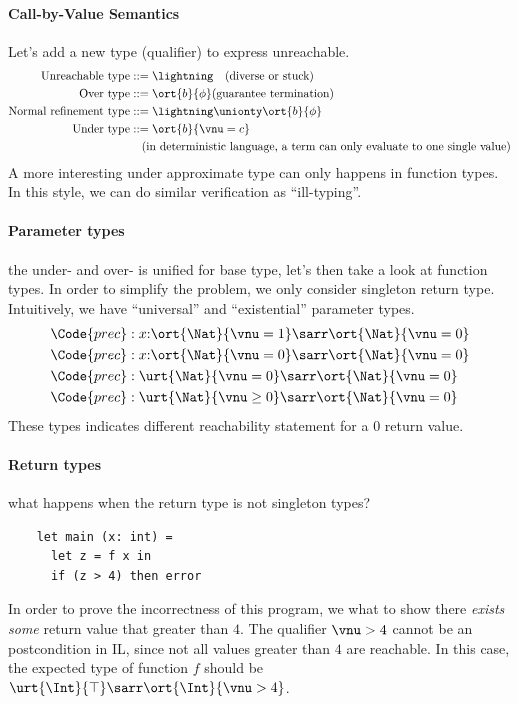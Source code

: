 \paragraph{Call-by-Value Semantics} Let's add a new type (qualifier) to express unreachable.
\begin{align*}
    \text{Unreachable type} & ::= \lightning \quad (\text{diverse or stuck})
    \\ \text{Over type} & ::= \ort{b}{\phi}  (\text{guarantee termination})
    \\ \text{Normal refinement type} & ::= \lightning \unionty \ort{b}{\phi}
    \\ \text{Under type} & ::= \ort{b}{\vnu = c} 
    \\ & \quad (\text{in deterministic language, a term can only evaluate to one single value})
\end{align*}\noindent
A more interesting under approximate type can only happens in function types. In this style, we can do similar verification as ``ill-typing''.

\paragraph{Parameter types} the under- and over- is unified for base type, let's then take a look at function types. In order to simplify the problem, we only consider singleton return type. Intuitively, we have ``universal'' and ``existential'' parameter types.
\begin{align*}
    \Code{prec} :\;& x{:}\ort{\Nat}{\vnu = 1} \sarr \ort{\Nat}{\vnu = 0} \\
    \Code{prec} :\;& x{:}\ort{\Nat}{\vnu = 0} \sarr \ort{\Nat}{\vnu = 0} \\
    \Code{prec} :\;& \urt{\Nat}{\vnu = 0} \sarr \ort{\Nat}{\vnu = 0} \\
    \Code{prec} :\;& \urt{\Nat}{\vnu \geq 0} \sarr \ort{\Nat}{\vnu = 0}
\end{align*}\noindent
These types indicates different reachability statement for a $0$ return value.

\paragraph{Return types} what happens when the return type is not singleton types?
\begin{verbatim}
    let main (x: int) =
      let z = f x in
      if (z > 4) then error
\end{verbatim}
In order to prove the incorrectness of this program, we what to show there \emph{exists some} return value that greater than $4$. The qualifier $\vnu > 4$ cannot be an postcondition in IL, since not all values greater than $4$ are reachable. In this case, the expected type of function $f$ should be $\urt{\Int}{\top} \sarr \ort{\Int}{\vnu > 4}$.

